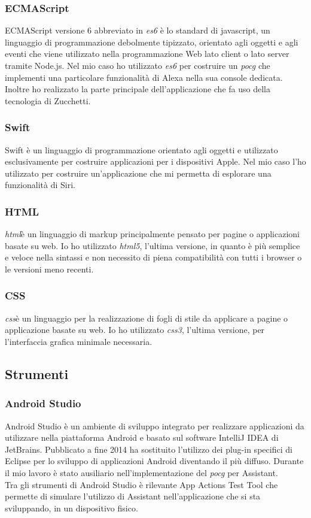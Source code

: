 		\subsubsection{ECMAScript}
		ECMAScript versione 6 abbreviato in \emph{\gls{es6}} è lo standard di javascript, un linguaggio di programmazione debolmente tipizzato, orientato agli oggetti e agli eventi che viene utilizzato nella programmazione Web lato client o lato server tramite Node.js. Nel mio caso ho utilizzato \emph{\gls{es6}} per costruire un \emph{\gls{pocg}} che implementi una particolare funzionalità di Alexa nella sua console dedicata. Inoltre ho realizzato la parte principale dell'applicazione che fa uso della tecnologia di Zucchetti.
		\subsubsection{Swift}
		Swift è un linguaggio di programmazione orientato agli oggetti e utilizzato esclusivamente per costruire applicazioni per i dispositivi Apple. Nel mio caso l'ho utilizzato per costruire un'applicazione che mi permetta di esplorare una funzionalità di Siri.
		\subsubsection{HTML}
		\emph{\gls{html}}\glsfirstoccur è un linguaggio di markup principalmente pensato per pagine o applicazioni basate su web. Io ho utilizzato \emph{\gls{html}5}, l'ultima versione, in quanto è più semplice e veloce nella sintassi e non necessito di piena compatibilità con tutti i browser o le versioni meno recenti.
		\subsubsection{CSS}
		\emph{\gls{css}}\glsfirstoccur è un linguaggio per la realizzazione di fogli di stile da applicare a pagine o applicazione basate su web. Io ho utilizzato \emph{\gls{css}3}, l'ultima versione, per l'interfaccia grafica minimale necessaria.
	\subsection{Strumenti}
		\subsubsection{Android Studio}
		Android Studio è un ambiente di sviluppo integrato per realizzare applicazioni da utilizzare nella piattaforma Android e basato sul software IntelliJ IDEA di JetBrains. Pubblicato a fine 2014 ha sostituito l'utilizzo dei plug-in specifici di Eclipse per lo sviluppo di applicazioni Android diventando il più diffuso. Durante il mio lavoro è stato ausiliario nell'implementazione del \emph{\gls{pocg}} per Assistant. \\
		Tra gli strumenti di Android Studio è rilevante App Actions Test Tool che permette di simulare l'utilizzo di Assistant nell'applicazione che si sta sviluppando, in un dispositivo fisico.
